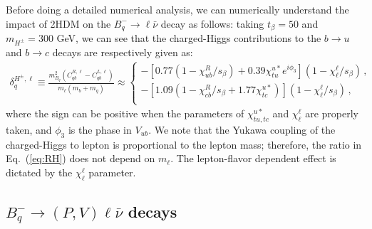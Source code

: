 \documentclass[prd,preprint,superscriptaddress,amsmath,amssymb]{revtex4}
\begin{document}
 Before doing  a detailed numerical analysis,  we can numerically understand the impact of 2HDM on the $B^-_q \to \ell \bar\nu$ decay as follows: taking $t_\beta = 50$ and $m_{H^\pm} = 300$ GeV,  we can see that the  charged-Higgs contributions to the $b\to u$ and $b\to c$ decays are respectively given as:
  \begin{align}
 \delta^{H^\pm,\ell}_{q}\equiv  \frac{m^2_{B_q} \left( C^{R,\ell}_{qb} - C^{L,\ell}_{qb} \right)}{m_\ell (m_b+m_q)} \approx \left\{ 
\begin{array}{c}
 - \left[ 0.77\left( 1 -\chi^R_{ub}/s_\beta \right) + 0.39  \chi^{u*}_{tu} e^{i  \phi_3} \right]\left( 1 -\chi^\ell_\ell/s_\beta \right)\,, \\
  -\left[1.09 \left( 1 -\chi^R_{cb}/s_\beta + 1.77  \chi^{u*}_{tc}  \right)\right]\left( 1 -\chi^\ell_\ell/s_\beta \right)\,,  \\  
\end{array} \right. \label{eq:RH}
  \end{align}
  where the sign can be positive when the parameters of $\chi^{u*}_{tu,tc}$ and $\chi^\ell_\ell$ are properly taken, and $\phi_3$ is the phase in $V_{ub}$. 
We note that the Yukawa coupling of the charged-Higgs  to lepton is proportional to the lepton mass; therefore, the ratio in Eq.~(\ref{eq:RH}) does not depend on $m_\ell$.  The lepton-flavor dependent effect is dictated by the $\chi^\ell_\ell$ parameter. 
 
 \subsection{  $B^-_q \to (P, V) \ell \bar\nu$ decays}
 
\end{document}
